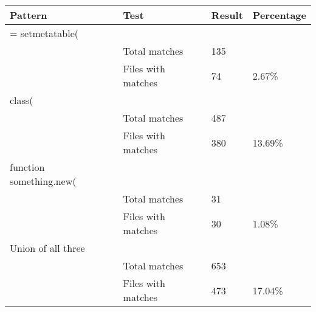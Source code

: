 \begin{center}
	\label{LuaResults}
	\begin{tabular}{|l|l|l|l|}
		\hline
		Pattern                 & Test               & Result & Percentage \\ \hline
		= setmetatable(        &                    &        &            \\ \hline
		& Total matches      & 135    &            \\ \hline
		& Files with matches & 74     & 2.67\%     \\ \hline
		class(                  &                    &        &            \\ \hline
		& Total matches      & 487    &            \\ \hline
		& Files with matches & 380    & 13.69\%    \\ \hline
		function something.new( &                    &        &            \\ \hline
		& Total matches      & 31     &            \\ \hline
		& Files with matches & 30     & 1.08\%     \\ \hline
		Union of all three      &                    &        &            \\ \hline
		& Total matches      & 653    &            \\ \hline
		& Files with matches & 473    & 17.04\%    \\ \hline
	\end{tabular}
\end{center}{










\iffalse
}
